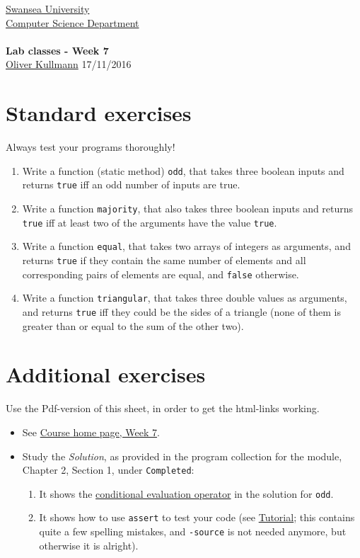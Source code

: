 \documentclass[11pt]{article}
\newcommand{\Java}{\lstset{language=Java,keywordstyle=\bfseries,breaklines,breakindent=30pt}}
\begin{document}
\begin{center}
  \href{http://www.swan.ac.uk/}{Swansea University}\\
  \href{http://www.swan.ac.uk/compsci/}{Computer Science Department}\\[1ex]
  \href{\chp}{\module}\\[1ex]
  \textbf{Lab classes - Week 7}\\
  \href{http://cs.swan.ac.uk/~csoliver}{Oliver Kullmann} 17/11/2016
\end{center}


\section{Standard exercises}
\label{sec:stdex}

\Java

Always test your programs thoroughly!

\begin{enumerate}
\item Write a function (static method) \texttt{odd}, that takes three boolean inputs and returns \texttt{true} iff an odd number of inputs are true.
\item Write a function \texttt{majority}, that also takes three boolean inputs and returns \texttt{true} iff at least two of the arguments have the value \texttt{true}.
\item Write a function \texttt{equal}, that takes two arrays of integers as arguments, and returns \texttt{true} if they contain the same number of elements and all corresponding pairs of elements are equal, and \texttt{false} otherwise.
\item Write a function \texttt{triangular}, that takes three double values as arguments, and returns \texttt{true} iff they could be the sides of a triangle (none of them is greater than or equal to the sum of the other two). 
\end{enumerate}


\section{Additional exercises}
\label{sec:addex}

Use the Pdf-version of this sheet, in order to get the html-links working.
\begin{itemize}
\item See \href{\chp#ExercisesWeek07}{Course home page, Week 7}.
\item Study the \emph{Solution}, as provided in the program collection for the module, Chapter 2, Section 1, under \texttt{Completed}:
  \begin{enumerate}
  \item It shows the \href{http://www.cafeaulait.org/course/week2/43.html}{conditional evaluation operator} in the solution for \texttt{odd}.
  \item It shows how to use \texttt{assert} to test your code (see \href{http://sqa.fyicenter.com/FAQ/JUnit/What_Is_Java_assert_Statement_.html}{Tutorial}; this contains quite a few spelling mistakes, and \texttt{-source} is not needed anymore, but otherwise it is alright).
  \end{enumerate}
\end{itemize}
\end{document}
